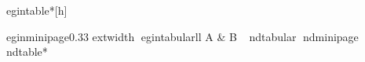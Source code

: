 egin{table*}[h]
\centering
\caption{resizebox 组合表}
\label{tab-complex}
egin{minipage}{0.33	extwidth}
egin{tabular}{ll}
A & B \
nd{tabular}
nd{minipage}
nd{table*}
